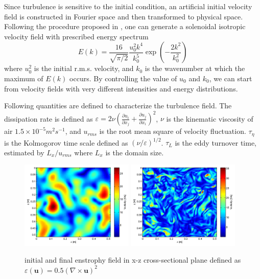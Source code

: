 \documentclass[draft,jgrga]{AGUTeX}
\begin{document}
\begin{article}
Since turbulence is sensitive to the initial condition, an artificial initial velocity field is constructed in Fourier space and then transformed to physical space. Following the procedure proposed in \cite{Rogallo81}, one can generate a solenoidal isotropic velocity field with prescribed energy spectrum \cite{Rosales05}
\begin{equation}
E(k) = \frac{16}{\sqrt{\pi/2}}\frac{u_0^2k^4}{k_0^5}\exp(-\frac{2k^2}{k_0^2})
\end{equation}
where $u_0^2$ is the initial r.m.s. velocity, and $k_0$ is the wavenumber at which the maximum of $E(k)$ occurs. By controlling the value of $u_0$ and $k_0$, we can start from velocity fields with very different intensities and energy distributions.

Following quantities are defined to characterize the turbulence field. 
The dissipation rate is defined as $\varepsilon=2\nu(\frac{\partial u_{i}}{\partial x_{j}}+\frac{\partial u_{j}}{\partial x_{i}})^{2}$,
$\nu$ is the kinematic viscosity of air $1.5\times10^{-5}m^{2}s^{-1}$, and $u_{rms}$
is the root mean square of velocity fluctuation. $\tau_{\eta}$ is
the Kolmogorov time scale defined as $(\nu/\varepsilon)^{1/2}$. $\tau_L$
is the eddy turnover time, estimated by $L_x/u_{rms}$
where $L_x$ is the domain size.

\begin{figure}[H]
\includegraphics[width=0.48\textwidth]{Figures/vortex-0}
\includegraphics[width=0.48\textwidth]{Figures/vortex-1}

\caption{initial and final enstrophy field in x-z cross-sectional
plane defined as $\varepsilon(\mathbf{u}) = 0.5(\nabla\times\mathbf{u})^2$\label{fig:enstrophy}}
\end{figure}


\end{article}
\end{document}
